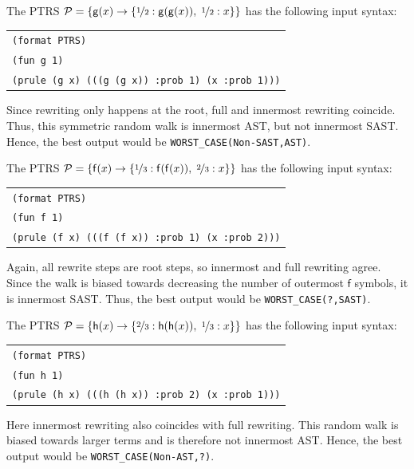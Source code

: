 \begin{example}
The PTRS $\mathcal{P} = \{\mathsf{g}(x) \to \{\nicefrac{1}{2}:\mathsf{g}(\mathsf{g}(x)),\; \nicefrac{1}{2}:x\}\}$
has the following input syntax:
\begin{center}
\begin{tabular}{l}
\texttt{(format PTRS)} \\
\texttt{(fun g 1)} \\
\texttt{(prule (g x) (((g (g x)) :prob 1) (x :prob 1)))}
\end{tabular}
\end{center}
Since rewriting only happens at the root, full and innermost rewriting coincide.
Thus, this symmetric random walk is innermost AST, but not innermost SAST.
Hence, the best output would be \texttt{WORST\_CASE(Non-SAST,AST)}.

The PTRS $\mathcal{P} = \{\mathsf{f}(x) \to \{\nicefrac{1}{3}:\mathsf{f}(\mathsf{f}(x)),\; \nicefrac{2}{3}:x\}\}$
has the following input syntax:
\begin{center}
\begin{tabular}{l}
\texttt{(format PTRS)} \\
\texttt{(fun f 1)} \\
\texttt{(prule (f x) (((f (f x)) :prob 1) (x :prob 2)))}
\end{tabular}
\end{center}
Again, all rewrite steps are root steps, so innermost and full rewriting agree.
Since the walk is biased towards decreasing the number of outermost $\mathsf{f}$ symbols, it is innermost SAST.
Thus, the best output would be \texttt{WORST\_CASE(?,SAST)}.

The PTRS $\mathcal{P} = \{\mathsf{h}(x) \to \{\nicefrac{2}{3}:\mathsf{h}(\mathsf{h}(x)),\; \nicefrac{1}{3}:x\}\}$
has the following input syntax:
\begin{center}
\begin{tabular}{l}
\texttt{(format PTRS)} \\
\texttt{(fun h 1)} \\
\texttt{(prule (h x) (((h (h x)) :prob 2) (x :prob 1)))}
\end{tabular}
\end{center}
Here innermost rewriting also coincides with full rewriting.
This random walk is biased towards larger terms and is therefore not innermost AST.
Hence, the best output would be \texttt{WORST\_CASE(Non-AST,?)}.
\end{example}
